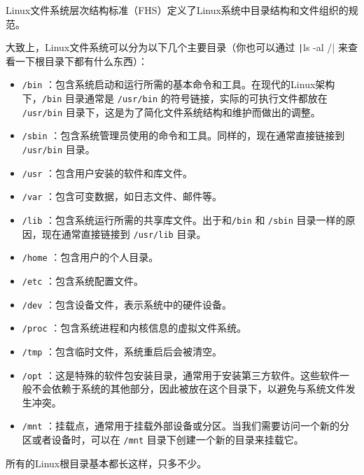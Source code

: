 Linux文件系统层次结构标准（FHS）定义了Linux系统中目录结构和文件组织的规范。

大致上，Linux文件系统可以分为以下几个主要目录（你也可以通过 \texttt|ls -al /| 来查看一下根目录下都有什么东西）：
\begin{itemize}
    \item \texttt{/bin} ：包含系统启动和运行所需的基本命令和工具。在现代的Linux架构下，\texttt{/bin} 目录通常是 \texttt{/usr/bin} 的符号链接，实际的可执行文件都放在 \texttt{/usr/bin} 目录下，这是为了简化文件系统结构和维护而做出的调整。
    \item \texttt{/sbin} ：包含系统管理员使用的命令和工具。同样的，现在通常直接链接到 \texttt{/usr/bin} 目录。
    \item \texttt{/usr} ：包含用户安装的软件和库文件。
    \item \texttt{/var} ：包含可变数据，如日志文件、邮件等。
    \item \texttt{/lib} ：包含系统运行所需的共享库文件。出于和\texttt{/bin} 和 \texttt{/sbin} 目录一样的原因，现在通常直接链接到 \texttt{/usr/lib} 目录。
    \item \texttt{/home} ：包含用户的个人目录。
    \item \texttt{/etc} ：包含系统配置文件。
    \item \texttt{/dev} ：包含设备文件，表示系统中的硬件设备。
    \item \texttt{/proc} ：包含系统进程和内核信息的虚拟文件系统。
    \item \texttt{/tmp} ：包含临时文件，系统重启后会被清空。
    \item \texttt{/opt} ：这是特殊的软件包安装目录，通常用于安装第三方软件。这些软件一般不会依赖于系统的其他部分，因此被放在这个目录下，以避免与系统文件发生冲突。
    \item \texttt{/mnt} ：挂载点，通常用于挂载外部设备或分区。当我们需要访问一个新的分区或者设备时，可以在 \texttt{/mnt} 目录下创建一个新的目录来挂载它。
\end{itemize}

所有的Linux根目录基本都长这样，只多不少。

